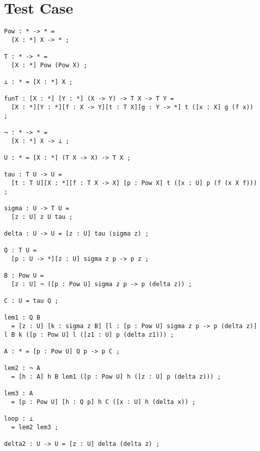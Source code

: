 \section{Test Case} \label{apdix:loop}
\begin{verbatim}
Pow : * -> * =
  [X : *] X -> * ;

T : * -> * =
  [X : *] Pow (Pow X) ;

⊥ : * = [X : *] X ;

funT : [X : *] [Y : *] (X -> Y) -> T X -> T Y =
  [X : *][Y : *][f : X -> Y][t : T X][g : Y -> *] t ([x : X] g (f x)) ;

¬ : * -> * =
  [X : *] X -> ⊥ ;

U : * = [X : *] (T X -> X) -> T X ;

tau : T U -> U =
  [t : T U][X : *][f : T X -> X] [p : Pow X] t ([x : U] p (f (x X f))) ;

sigma : U -> T U =
  [z : U] z U tau ;

delta : U -> U = [z : U] tau (sigma z) ;

Q : T U =
  [p : U -> *][z : U] sigma z p -> p z ;

B : Pow U =
  [z : U] ¬ ([p : Pow U] sigma z p -> p (delta z)) ;

C : U = tau Q ;

lem1 : Q B
  = [z : U] [k : sigma z B] [l : [p : Pow U] sigma z p -> p (delta z)] l B k ([p : Pow U] l ([z1 : U] p (delta z1))) ;

A : * = [p : Pow U] Q p -> p C ;

lem2 : ¬ A
  = [h : A] h B lem1 ([p : Pow U] h ([z : U] p (delta z))) ;

lem3 : A
  = [p : Pow U] [h : Q p] h C ([x : U] h (delta x)) ;

loop : ⊥
  = lem2 lem3 ;

delta2 : U -> U = [z : U] delta (delta z) ;
\end{verbatim}
